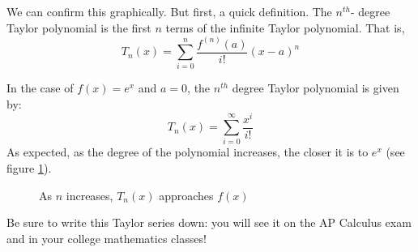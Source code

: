 We can confirm this graphically. But first, a quick definition. The $n^{th}$-
degree Taylor polynomial is the first $n$ terms of the infinite Taylor 
polynomial. That is,
$$T_n(x) = \sum_{i=0}^n \frac{f^{(n)}(a)}{i!}(x - a)^n$$

In the case of $f(x) = e^x$ and $a = 0$, the $n^{th}$ degree Taylor polynomial 
is given by:
$$T_n(x) = \sum_{i = 0}^\infty \frac{x^i}{i!}$$
As expected, as the degree of the polynomial increases, the closer it is to 
$e^x$ (see figure \ref{taylorexp}).

\begin{figure}[htbp]
\centering
    \caption{As $n$ increases, $T_n(x)$ approaches $f(x)$}
    \label{taylorexp}
\end{figure}

Be sure to write this Taylor series down: you will see it on the AP Calculus 
exam and in your college mathematics classes!

